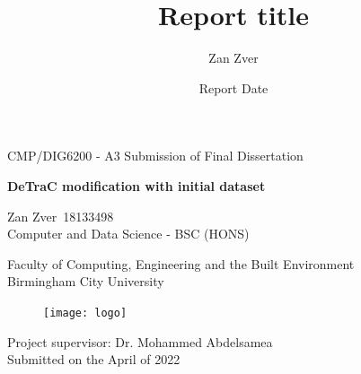 \documentclass[12pt,a4paper]{article}
\title{Report title}
\author{Zan Zver}
\date{Report Date }
\newcommand{\authorName}{Zan Zver}
\newcommand{\authorID}{18133498}
\newcommand{\reportTitle}{DeTraC modification with initial dataset}
\begin{document}
\begin{titlepage}
   \begin{center}
       CMP/DIG6200 - A3 Submission of Final Dissertation
       \vspace*{0.5cm}

       \huge\textbf{\reportTitle} 

            
       \vspace{1.5cm}

       \authorName \ \authorID \\
       \vspace{0.3cm}
       \large{Computer and Data Science - BSC (HONS)}


            
       \vspace{0.3cm}
            
       \large{Faculty of Computing, Engineering and the Built Environment \\
       Birmingham City University \\}
       
       \begin{figure}[htp]
        \centering
        \texttt{[image: logo]}
        \end{figure}
        
       \vspace{0.3cm}
       \large{Project supervisor: Dr. Mohammed Abdelsamea\\}
       \large{Submitted on the April of 2022}
            
   \end{center}
\end{titlepage}
\pagestyle{fancy}
\fancyhf{}
\setlength{\headsep}{50pt}

%

%

\end{document}
